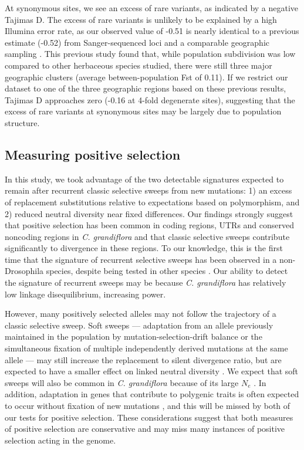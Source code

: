 At synonymous sites, we see an excess of rare variants, as indicated by a negative Tajima\textsc{}s D. The excess of rare variants is unlikely to be explained by a high Illumina error rate, as our observed value of -0.51 is nearly identical to a previous estimate (-0.52) from Sanger-sequenced loci and a comparable geographic sampling \citep{St_onge2011-jz}. This previous study found that, while population subdivision was low compared to other herbaceous species studied, there were still three major geographic clusters (average between-population Fst of 0.11). If we restrict our dataset to one of the three geographic regions based on these previous results, Tajima\textsc{}s D approaches zero (-0.16 at 4-fold degenerate sites), suggesting that the excess of rare variants at synonymous sites may be largely due to population structure. 

\subsection{Measuring positive selection}
	In this study, we took advantage of the two detectable signatures expected to remain after recurrent classic selective sweeps from new mutations: 1) an excess of replacement substitutions relative to expectations based on polymorphism, and 2) reduced neutral diversity near fixed differences. Our findings strongly suggest that positive selection has been common in coding regions, UTRs and conserved noncoding regions in \textit{C. grandiflora} and that classic selective sweeps contribute significantly to divergence in these regions. To our knowledge, this is the first time that the signature of recurrent selective sweeps has been observed in a non-Drosophila species, despite being tested in other species \citep{Halligan2013,hernandez2011}. Our ability to detect the signature of recurrent sweeps may be because \textit{C. grandiflora} has relatively low linkage disequilibrium, increasing power.

However, many positively selected alleles may not follow the trajectory of a classic selective sweep. Soft sweeps — adaptation from an allele previously maintained in the population by mutation-selection-drift balance or the simultaneous fixation of multiple independently derived mutations at the same allele — may still increase the replacement to silent divergence ratio, but are expected to have a smaller effect on linked neutral diversity \citep{hermisson2005,pennings2006_2,pennings2006_3}. We expect that soft sweeps will also be common in \textit{C. grandiflora} because of its large $N_{e}$ \citep{hermisson2005,messer2013}. In addition, adaptation in genes that contribute to polygenic traits is often expected to occur without fixation of new mutations \citep{pavlidis2012}, and this will be missed by both of our tests for positive selection. These considerations suggest that both measures of positive selection are conservative and may miss many instances of positive selection acting in the genome.

